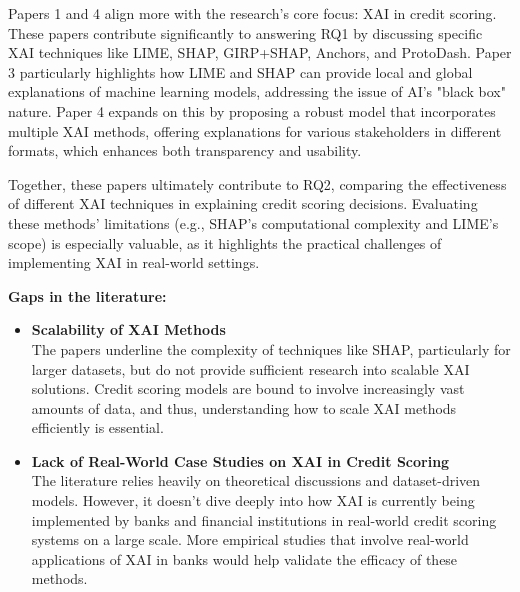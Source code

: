 \documentclass[12pt,a4paper]{article}
\begin{document}
Papers 1 and 4 align more with the research's core focus: XAI in credit scoring. These papers contribute significantly to answering RQ1 by discussing specific XAI techniques like LIME, SHAP, GIRP+SHAP, Anchors, and ProtoDash. Paper 3 particularly highlights how LIME and SHAP can provide local and global explanations of machine learning models, addressing the issue of AI’s "black box" nature. Paper 4 expands on this by proposing a robust model that incorporates multiple XAI methods, offering explanations for various stakeholders in different formats, which enhances both transparency and usability.

Together, these papers ultimately contribute to RQ2, comparing the effectiveness of different XAI techniques in explaining credit scoring decisions. Evaluating these methods’ limitations (e.g., SHAP’s computational complexity and LIME’s scope) is especially valuable, as it highlights the practical challenges of implementing XAI in real-world settings.

\textbf{Gaps in the literature:}\\
\begin{itemize}
    \vspace{-3em}
    \item \textbf{Scalability of XAI Methods}\\
    The papers underline the complexity of techniques like SHAP, particularly for larger datasets, but do not provide sufficient research into scalable XAI solutions. Credit scoring models are bound to involve increasingly vast amounts of data, and thus, understanding how to scale XAI methods efficiently is essential.
    \item \textbf{Lack of Real-World Case Studies on XAI in Credit Scoring}\\
    The literature relies heavily on theoretical discussions and dataset-driven models. However, it doesn't dive deeply into how XAI is currently being implemented by banks and financial institutions in real-world credit scoring systems on a large scale. More empirical studies that involve real-world applications of XAI in banks would help validate the efficacy of these methods.
\end{itemize}
\end{document}
